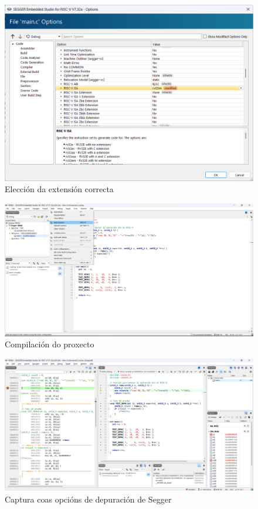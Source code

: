 \begin{figure}[hp!]
  \centering
  \includegraphics[width=\textwidth]{imaxes/Cap_2.png}
  \caption{Elección da extensión correcta}
  \label{fig:cap2}
\end{figure}


\begin{figure}[hp!]
  \centering
  \includegraphics[width=\textwidth]{imaxes/Cap_3_Comp.png}
  \caption{Compilación do proxecto}
  \label{fig:compilar}
\end{figure}

\begin{figure}[hp!]
  \centering
  \includegraphics[width=\textwidth]{imaxes/Cap_4_Debug.png}
  \caption{Captura coas opcións de depuración de Segger}
  \label{fig:cap3}
\end{figure}

